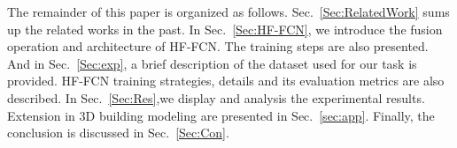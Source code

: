 The remainder of this paper is organized as follows. Sec.~\ref{Sec:RelatedWork} sums up the related works in the past.
In Sec.~\ref{Sec:HF-FCN}, we introduce the fusion operation and architecture of HF-FCN. The training steps are also presented.
And in Sec.~\ref{Sec:exp}, a brief description of the dataset used for our task is provided. HF-FCN training strategies, details and its evaluation metrics are also described.
In Sec.~\ref{Sec:Res},we display and analysis the experimental results.
Extension in 3D building modeling are presented in Sec.~\ref{sec:app}.
Finally, the conclusion is discussed in Sec.~\ref{Sec:Con}.
